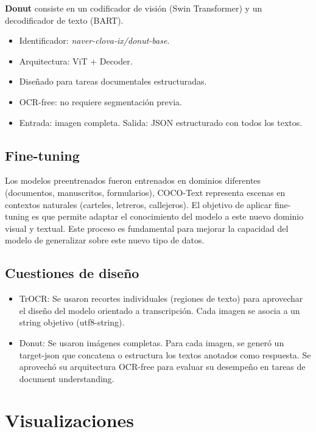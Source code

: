 \documentclass[12pt]{article}
\begin{document}
\textbf{Donut} \cite{donut} consiste en un codificador de visión (Swin Transformer) y un decodificador de texto (BART).

\begin{itemize}
    \item Identificador: \textit{naver-clova-ix/donut-base}.
    \item Arquitectura: ViT + Decoder.
    \item Diseñado para tareas documentales estructuradas.
    \item OCR-free: no requiere segmentación previa.
    \item Entrada: imagen completa. Salida: JSON estructurado con todos los textos.
\end{itemize}

\subsection{Fine-tuning}

Los modelos preentrenados fueron entrenados en dominios diferentes (documentos, manuscritos, formularios), 
COCO-Text representa escenas en contextos naturales (carteles, letreros, callejeros). El objetivo de aplicar
fine-tuning es que permite adaptar el conocimiento del modelo a este nuevo dominio visual y textual. Este proceso
es fundamental para mejorar la capacidad del modelo de generalizar sobre este nuevo tipo de datos.


\subsection{Cuestiones de diseño}

\begin{itemize}
    \item TrOCR: Se usaron recortes individuales (regiones de texto) para aprovechar el diseño del modelo orientado a transcripción.
    Cada imagen se asocia a un string objetivo (utf8-string).
    \item Donut: Se usaron imágenes completas. Para cada imagen, se generó un target-json que concatena o estructura los textos anotados como respuesta.
    Se aprovechó su arquitectura OCR-free para evaluar su desempeño en tareas de document understanding.
\end{itemize}


\section{Visualizaciones}
\end{document}
